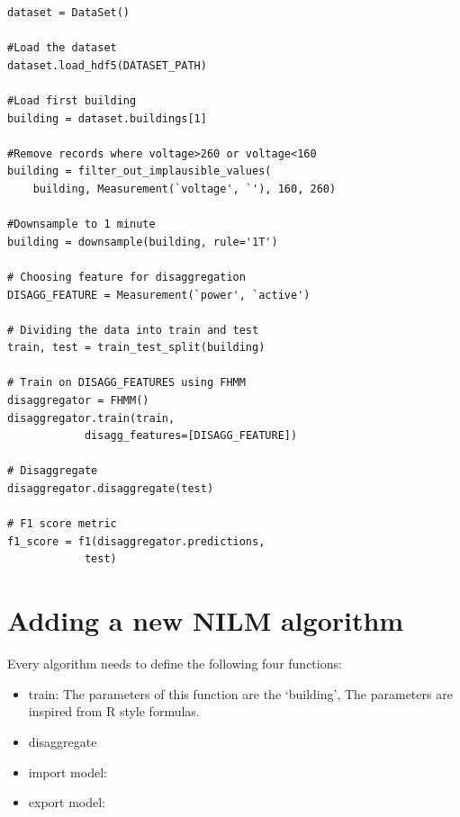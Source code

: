 \documentclass{sig-alternate}
\begin{document}
\begin{verbatim}
dataset = DataSet()

#Load the dataset
dataset.load_hdf5(DATASET_PATH)

#Load first building
building = dataset.buildings[1]

#Remove records where voltage>260 or voltage<160
building = filter_out_implausible_values(
    building, Measurement(`voltage', `'), 160, 260)
    
#Downsample to 1 minute
building = downsample(building, rule='1T')

# Choosing feature for disaggregation
DISAGG_FEATURE = Measurement(`power', `active')

# Dividing the data into train and test
train, test = train_test_split(building)

# Train on DISAGG_FEATURES using FHMM
disaggregator = FHMM()
disaggregator.train(train, 
            disagg_features=[DISAGG_FEATURE])
            
# Disaggregate
disaggregator.disaggregate(test)

# F1 score metric
f1_score = f1(disaggregator.predictions, 
            test)
\end{verbatim}

\section{Adding a new NILM algorithm}
Every algorithm needs to define the following four functions:
\begin{itemize}
\item train: The parameters of this function are the `building',
The parameters are inspired from R style formulas.
\item disaggregate
\item import model: 
\item export model:
\end{itemize}


\end{document}
